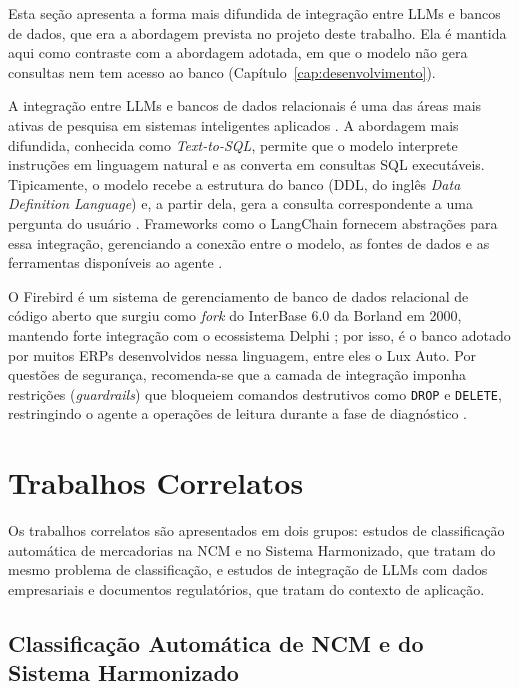 Esta seção apresenta a forma mais difundida de integração entre LLMs e bancos de dados, que era a abordagem prevista no projeto deste trabalho. Ela é mantida aqui como contraste com a abordagem adotada, em que o modelo não gera consultas nem tem acesso ao banco (Capítulo~\ref{cap:desenvolvimento}).

A integração entre LLMs e bancos de dados relacionais é uma das áreas mais ativas de pesquisa em sistemas inteligentes aplicados \cite{hong2024texttosql}. A abordagem mais difundida, conhecida como \textit{Text-to-SQL}, permite que o modelo interprete instruções em linguagem natural e as converta em consultas SQL executáveis. Tipicamente, o modelo recebe a estrutura do banco (DDL, do inglês \textit{Data Definition Language}) e, a partir dela, gera a consulta correspondente a uma pergunta do usuário \cite{silva2025}. Frameworks como o LangChain fornecem abstrações para essa integração, gerenciando a conexão entre o modelo, as fontes de dados e as ferramentas disponíveis ao agente \cite{langchain2022}.

O Firebird é um sistema de gerenciamento de banco de dados relacional de código aberto que surgiu como \textit{fork} do InterBase 6.0 da Borland em 2000, mantendo forte integração com o ecossistema Delphi \cite{firebird2024about}; por isso, é o banco adotado por muitos ERPs desenvolvidos nessa linguagem, entre eles o Lux Auto. Por questões de segurança, recomenda-se que a camada de integração imponha restrições (\textit{guardrails}) que bloqueiem comandos destrutivos como \texttt{DROP} e \texttt{DELETE}, restringindo o agente a operações de leitura durante a fase de diagnóstico \cite{Roychowdhury2025NLIDB}.

\section{Trabalhos Correlatos}

Os trabalhos correlatos são apresentados em dois grupos: estudos de classificação automática de mercadorias na NCM e no Sistema Harmonizado, que tratam do mesmo problema de classificação, e estudos de integração de LLMs com dados empresariais e documentos regulatórios, que tratam do contexto de aplicação.

\subsection{Classificação Automática de NCM e do Sistema Harmonizado}

